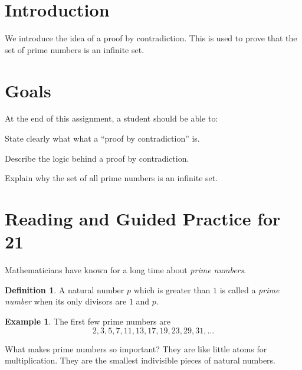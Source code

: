 \documentclass[12pt,letterpaper]{article}
\theoremstyle{definition}
\newtheorem{example}{Example}
\newtheorem*{definition}{Definition}
\begin{document}
\setlength{\parskip}{1ex plus 0.5ex minus 0.2ex}
\setlength{\parindent}{0pt}

\pagestyle{fancy}
\cfoot{}

\section*{Introduction}
We introduce the idea of a proof by contradiction.
This is used to prove that the set of prime numbers is an infinite set.

\section*{Goals}
At the end of this assignment, a student should be able to:
\begin{compactitem}
\item State clearly what what a ``proof by contradiction'' is.
\item Describe the logic behind a proof by contradiction.
\item Explain why the set of all prime numbers is an infinite set.
\end{compactitem}


\section*{Reading and Guided Practice for 21}

Mathematicians have known for a long time about \emph{prime numbers}.

\begin{definition} 
A natural number $p$ which is greater than $1$ is called a \emph{prime number} when its only divisors are $1$ and $p$.
\end{definition}

\begin{example}
The first few prime numbers are 
\[2, 3, 5, 7, 11, 13, 17, 19, 23, 29, 31, \ldots\]
\end{example}

What makes prime numbers so important?
They are like little atoms for multiplication.
They are the smallest indivisible pieces of natural numbers.
\end{document}

